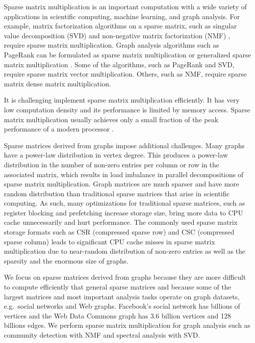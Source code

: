Sparse matrix multiplication is an important computation with a wide variety
of applications in scientific computing, machine learning, and graph analysis.
For example, matrix factorization algorithms on a sparse matrix, such as
singular value decomposition (SVD) \cite{svd} and non-negative matrix
factorization (NMF) \cite{nmf}, require sparse matrix multiplication.
Graph analysis algorithms such as PageRank \cite{pagerank} can be
formulated as sparse matrix multiplication or generalized sparse matrix
multiplication \cite{Mattson13}. Some of
the algorithms, such as PageRank and SVD, require sparse matrix vector
multiplication. Others, such as NMF, require sparse matrix dense
matrix multiplication.

It is challenging implement sparse matrix multiplication efficiently. 
It has very low computation density and its
performance is limited by memory access. Sparse matrix multiplication usually achieves only
a small fraction of the peak performance of a modern processor \cite{Williams07}.

Sparse matrices derived from graphs impose additional challenges.
Many graphs have a power-law distribution in vertex
degree.  This produces a power-law distribution in the number of non-zero 
entries per column or row in the associated matrix, which   
results in load imbalance in parallel decompositions of sparse 
matrix multiplication. 
Graph matrices are much sparser and have more random distribution 
than traditional sparse matrices that arise in scientific
computing. As such, many optimizations for traditional sparse matrices, such
as register blocking and prefetching \cite{Williams07} increase storage size,
bring more data to CPU cache unnecessarily and hurt performance.
The commonly used sparse matrix storage formats such as CSR (compressed sparse
row) and CSC (compressed sparse column) leads to significant CPU cache misses
in sparse matrix multiplication due to near-random distribution of non-zero
entries as well as the sparsity and the enormous size of graphs. 

We focus on sparse matrices derived from graphs because they are more difficult 
to compute efficiently that general sparse matrices and because some of the 
largest matrices and most important analysis tasks operate on graph datasets, 
e.g.~social networks and Web graphs. 
Facebook's social network has billions of vertices and
the Web Data Commons graph  has 3.6 billion vertices and 128 billions edges.
We perform sparse matrix multiplication for graph
analysis such as community detection with NMF and spectral analysis with SVD.

